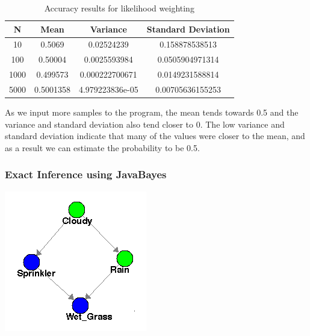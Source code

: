 \documentclass{article}
\begin{document}
\begin{table}[h]
\centering
\begin{tabular}{|c|c|c|c|}
\hline
N    & Mean      & Variance        & Standard Deviation \\ \hline
10   & 0.5069    & 0.02524239      & 0.158878538513     \\ \hline
100  & 0.50004   & 0.0025593984    & 0.0505904971314    \\ \hline
1000 & 0.499573  & 0.000222700671  & 0.0149231588814    \\ \hline
5000 & 0.5001358 & 4.979223836e-05 & 0.00705636155253   \\ \hline
\end{tabular}
\caption {Accuracy results for likelihood weighting}
\end{table}

As we input more samples to the program, the mean tends towards 0.5 and the variance and standard deviation also tend closer to 0. The low variance and standard deviation indicate that many of the values were closer to the mean, and as a result we can estimate the probability to be 0.5. \\

\subsubsection{Exact Inference using JavaBayes}
\begin{minipage}{\linewidth}
\begin{center}
\includegraphics[scale=0.7]{part4_bn}
\end{center}
\end{minipage}\\
\end{document}
